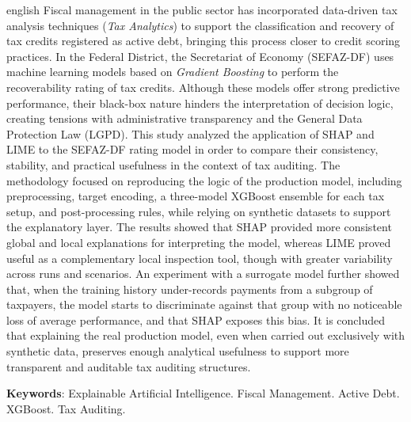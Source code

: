 \begin{resumo}[Abstract]
 \begin{otherlanguage*}{english}
   Fiscal management in the public sector has incorporated data-driven tax analysis techniques (\textit{Tax Analytics}) to support the classification and recovery of tax credits registered as active debt, bringing this process closer to credit scoring practices. In the Federal District, the Secretariat of Economy (SEFAZ-DF) uses machine learning models based on \textit{Gradient Boosting} to perform the recoverability rating of tax credits. Although these models offer strong predictive performance, their black-box nature hinders the interpretation of decision logic, creating tensions with administrative transparency and the General Data Protection Law (LGPD). This study analyzed the application of SHAP and LIME to the SEFAZ-DF rating model in order to compare their consistency, stability, and practical usefulness in the context of tax auditing. The methodology focused on reproducing the logic of the production model, including preprocessing, target encoding, a three-model XGBoost ensemble for each tax setup, and post-processing rules, while relying on synthetic datasets to support the explanatory layer. The results showed that SHAP provided more consistent global and local explanations for interpreting the model, whereas LIME proved useful as a complementary local inspection tool, though with greater variability across runs and scenarios. An experiment with a surrogate model further showed that, when the training history under-records payments from a subgroup of taxpayers, the model starts to discriminate against that group with no noticeable loss of average performance, and that SHAP exposes this bias. It is concluded that explaining the real production model, even when carried out exclusively with synthetic data, preserves enough analytical usefulness to support more transparent and auditable tax auditing structures.

   \vspace{\onelineskip}
 
   \noindent 
   \textbf{Keywords}: Explainable Artificial Intelligence. Fiscal Management. Active Debt. XGBoost. Tax Auditing.
 \end{otherlanguage*}
\end{resumo}
